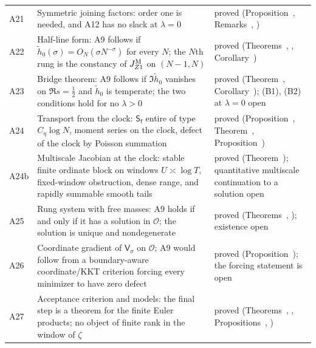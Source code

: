 \documentclass[11pt,reqno]{amsart}
\makeatletter
\let\CG@origref\ref
\newcommand{\CG@gettip}[1]{\@ifundefined{CGTip@#1}{Reference: #1}{\csname CGTip@#1\endcsname}}
\DeclareRobustCommand{\CGref}[1]{\pdftooltip{\CG@origref{#1}}{\CG@gettip{#1}}}
\numberwithin{equation}{section}
\theoremstyle{plain}
\theoremstyle{definition}
\theoremstyle{remark}
\makeatother
\begin{document}
\begin{longtable}{p{}p{}p{}}
A21 & Symmetric joining factors: order one is needed, and A12 has no slack at $\lambda=0$ & proved (Proposition~\CGref{prop:dichotomy}, Remarks~\CGref{rem:pair-no-slack}, \CGref{rem:dichotomy-counterexample})\\
A22 & Half-line form: A9 follows if $\tilde h_0(\sigma)=O_N(\sigma N^{-\sigma})$ for every $N$; the $N$th rung is the constancy of $J^{\rm M}_{Z1}$ on $(N-1,N)$ & proved (Theorems~\CGref{thm:ladder}, \CGref{thm:halfline-hamburger}, Corollary~\CGref{cor:ladder-pair})\\
A23 & Bridge theorem: A9 follows if $\Im\tilde h_0$ vanishes on $\Re s=\frac12$ and $\tilde h_0$ is temperate; the two conditions hold for no $\lambda>0$ & proved (Theorem~\CGref{thm:bridge}, Corollary~\CGref{cor:bridge-family}); \textup{(B1)}, \textup{(B2)} at $\lambda=0$ open\\
A24 & Transport from the clock: $\mathsf S_{\mathsf f}$ entire of type $C_\eta\log N$, moment series on the clock, defect of the clock by Poisson summation & proved (Proposition~\CGref{prop:rung-functional}, Theorem~\CGref{thm:transport-band}, Proposition~\CGref{prop:clock-defect-poisson})\\
A24b & Multiscale Jacobian at the clock: stable finite ordinate block on windows $U\asymp\log T$, fixed-window obstruction, dense range, and rapidly summable smooth tails & proved (Theorem~\CGref{thm:clock-jacobian}); quantitative multiscale continuation to a solution open\\
A25 & Rung system with free masses: A9 holds if and only if it has a solution in $\mathscr O$; the solution is unique and nondegenerate & proved (Theorems~\CGref{thm:free-masses}, \CGref{thm:nondegenerate}); existence open\\
A26 & Coordinate gradient of $\mathsf V_\sigma$ on $\mathscr O$; A9 would follow from a boundary-aware coordinate/KKT criterion forcing every minimizer to have zero defect & proved (Proposition~\CGref{prop:critical-points}); the forcing statement is open\\
A27 & Acceptance criterion and models: the final step is a theorem for the finite Euler products; no object of finite rank in the window of $\zeta$ & proved (Theorems~\CGref{thm:acceptance}, \CGref{thm:finite-euler}, Propositions~\CGref{prop:graph-model}, \CGref{prop:no-finite-rank})\\
\end{longtable}
\endgroup
\end{document}
